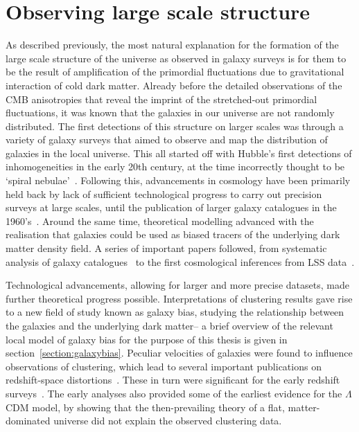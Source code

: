 \section{Observing large scale structure}

As described previously, the most natural explanation for the formation of the large scale structure of the universe as observed in galaxy surveys is for them to be the result of amplification of the primordial fluctuations due to gravitational interaction of cold dark matter. Already before the detailed observations of the CMB anisotropies that reveal the imprint of the stretched-out primordial fluctuations, it was known that the galaxies in our universe are not randomly distributed. The first detections of this structure on larger scales was through a variety of galaxy surveys that aimed to observe and map the distribution of galaxies in the local universe. This all started off with Hubble's first detections of inhomogeneities in the early 20th century, at the time incorrectly thought to be `spiral nebulae'~\cite{Hubble:1926,Hubble:1934}. Following this, advancements in cosmology have been primarily held back by lack of sufficient technological progress to carry out precision surveys at large scales, until the publication of larger galaxy catalogues in the 1960's~\cite{Shane:1967,Zwicky:1961}. Around the same time, theoretical modelling advanced with the realisation that galaxies could be used as biased tracers of the underlying dark matter density field. A series of important papers followed, from systematic analysis of galaxy catalogues~\cite{Peebles:1973} to the first cosmological inferences from LSS data~\cite{Zeldovich:1970,Davis:1977mar,Davis:1977aug,Davis:1983,Peebles:1980,Maddox:1990,Baumgart:1991,Park:1992}. 

Technological advancements, allowing for larger and more precise datasets, made further theoretical progress possible. Interpretations of clustering results gave rise to a new field of study known as galaxy bias, studying the relationship between the galaxies and the underlying dark matter\cite{Davis:1985,Rees:1985,Cole:1989vx,Kaiser:1984}-- a brief overview of the relevant local model of galaxy bias for the purpose of this thesis is given in section~\ref{section:galaxybias}. Peculiar velocities of galaxies were found to influence observations of clustering, which lead to several important publications on redshift-space distortions~\cite{Kaiser:1987qv,Davis:1983,Hamilton:1992zz}. These in turn were significant for the early redshift surveys~\cite{Cole:1994wf,Loveday:1995gk,Tadros:1999ky}. The early analyses also provided some of the earliest evidence for the $\Lambda$CDM model, by showing that the then-prevailing theory of a flat, matter-dominated universe did not explain the observed clustering data.

